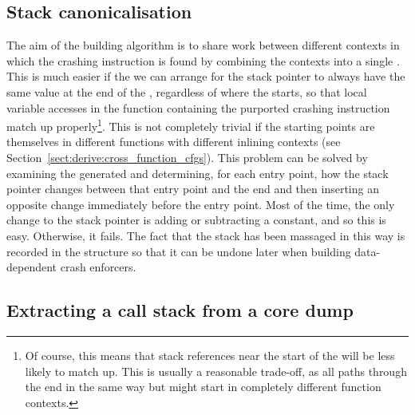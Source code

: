 \subsection{Stack canonicalisation}


The aim of the {\StateMachine} building algorithm is to share work
between different contexts in which the crashing instruction is found
by combining the contexts into a single {\StateMachine}.  This is much
easier if the we can arrange for the stack pointer to always have the
same value at the end of the {\StateMachine}, regardless of where the
{\StateMachine} starts, so that local variable accesses in the
function containing the purported crashing instruction match up
properly\footnote{Of course, this means that stack references near the
  start of the {\StateMachine} will be less likely to match up.  This
  is usually a reasonable trade-off, as all paths through the
  {\StateMachine} end in the same way but might start in completely
  different function contexts.  }.  This is not
completely trivial if the starting points are themselves in different
functions with different inlining contexts (see
Section~\ref{sect:derive:cross_function_cfgs}).  This problem can be
solved by examining the generated {\StateMachine} and determining, for
each entry point, how the stack pointer changes between that entry
point and the end and then inserting an opposite change immediately
before the entry point.  Most of the time, the only change to the
stack pointer is adding or subtracting a constant, and so this is
easy.  Otherwise, it fails.  The fact that the stack has been massaged
in this way is recorded in the {\StateMachine} structure so that it
can be undone later when building data-dependent crash enforcers.



\subsection{Extracting a call stack from a core dump}


